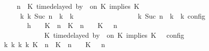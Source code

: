 \begin{isabellebody}
\ \ \ \ \ \ \ \ \ \ \ \ \ \ {\isacharparenleft}{\isacharparenleft}{\isasymGamma}{\isacharcomma}\ n\ {\isasymturnstile}\ {\isacharparenleft}{\isacharparenleft}K\ time{\isacharminus}delayed\ by\ {\isasymdelta}{\isasymtau}\ on\ K\ implies\ K\ {\isacharhash}\ {\isasymPsi}{\isacharparenright}\ {\isasymtriangleright}\ {\isasymPhi}{\isacharparenright}\isanewline
\ \ \ \ \ \ \ \ \ \ \ \ \ \ \ \ {\isasymhookrightarrow}\isactrlbsup k\isactrlesup \ {\isacharparenleft}{\isasymGamma}\isactrlsub k{\isacharcomma}\ Suc\ n\ {\isasymturnstile}\ {\isasymPsi}\isactrlsub k\ {\isasymtriangleright}\ {\isasymPhi}\isactrlsub k{\isacharparenright}{\isacharparenright}\isanewline
\ \ \ \ \ \ \ \ \ \ \ \ \ \ {\isasymand}\ {\isasymrho}\ {\isasymin}\ {\isasymlbrakk}\ {\isasymGamma}\isactrlsub k{\isacharcomma}\ Suc\ n\ {\isasymturnstile}\ {\isasymPsi}\isactrlsub k\ {\isasymtriangleright}\ {\isasymPhi}\isactrlsub k\ {\isasymrbrakk}\isactrlsub c\isactrlsub o\isactrlsub n\isactrlsub f\isactrlsub i\isactrlsub g{\isacartoucheclose}\isanewline
\ \ \ \ \ \ \isamarkupfalse%
\ {\isacharminus}\isanewline
\ \ \ \ \ \ \ \ \isamarkupfalse%
\ h{}{\isacharcolon}\ {\isacartoucheopen}{\isasymrho}\ {\isasymin}\ {\isasymlbrakk}\ {\isacharparenleft}{\isacharparenleft}K\ {\isasymUp}\ n{\isacharparenright}\ {\isacharhash}\ {\isacharparenleft}K\ {\isacharat}\ n\ {\isasymoplus}\ {\isasymdelta}{\isasymtau}\ {\isasymRightarrow}\ K\ {\isacharhash}\ {\isasymGamma}{\isacharparenright}{\isacharcomma}\ n\isanewline
\ \ \ \ \ \ \ \ \ \ \ \ \ \ \ \ \ \ \ \ {\isasymturnstile}\ {\isasymPsi}\ {\isasymtriangleright}\ {\isacharparenleft}{\isacharparenleft}K\ time{\isacharminus}delayed\ by\ {\isasymdelta}{\isasymtau}\ on\ K\ implies\ K\ {\isacharhash}\ {\isasymPhi}{\isacharparenright}\ {\isasymrbrakk}\isactrlsub c\isactrlsub o\isactrlsub n\isactrlsub f\isactrlsub i\isactrlsub g{\isacartoucheclose}\isanewline
\ \ \ \ \ \ \ \ \isamarkupfalse%
\ \isamarkupfalse%
\ {\isacartoucheopen}{\isasymexists}{\isasymGamma}\isactrlsub k\ {\isasymPsi}\isactrlsub k\ {\isasymPhi}\isactrlsub k\ k{\isachardot}\ {\isacharparenleft}{\isacharparenleft}{\isacharparenleft}{\isacharparenleft}K\ {\isasymUp}\ n{\isacharparenright}\ {\isacharhash}\ {\isacharparenleft}K\ {\isacharat}\ n\ {\isasymoplus}\ {\isasymdelta}{\isasymtau}\ {\isasymRightarrow}\ K\ {\isacharhash}\ {\isasymGamma}{\isacharparenright}{\isacharcomma}\ n\isanewline

\end{isabellebody}
